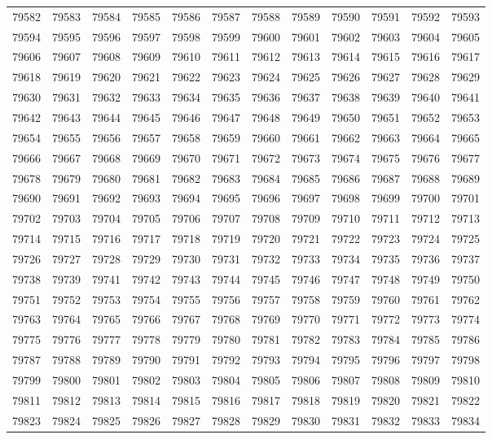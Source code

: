 \begin{center}
\begin{longtable}{llllllllllll}
79582 &79583 &79584 &79585 &79586 &79587 &79588 &79589 &79590 &79591 &79592 &79593 \\
79594 &79595 &79596 &79597 &79598 &79599 &79600 &79601 &79602 &79603 &79604 &79605 \\
79606 &79607 &79608 &79609 &79610 &79611 &79612 &79613 &79614 &79615 &79616 &79617 \\
79618 &79619 &79620 &79621 &79622 &79623 &79624 &79625 &79626 &79627 &79628 &79629 \\
79630 &79631 &79632 &79633 &79634 &79635 &79636 &79637 &79638 &79639 &79640 &79641 \\
79642 &79643 &79644 &79645 &79646 &79647 &79648 &79649 &79650 &79651 &79652 &79653 \\
79654 &79655 &79656 &79657 &79658 &79659 &79660 &79661 &79662 &79663 &79664 &79665 \\
79666 &79667 &79668 &79669 &79670 &79671 &79672 &79673 &79674 &79675 &79676 &79677 \\
79678 &79679 &79680 &79681 &79682 &79683 &79684 &79685 &79686 &79687 &79688 &79689 \\
79690 &79691 &79692 &79693 &79694 &79695 &79696 &79697 &79698 &79699 &79700 &79701 \\
79702 &79703 &79704 &79705 &79706 &79707 &79708 &79709 &79710 &79711 &79712 &79713 \\
79714 &79715 &79716 &79717 &79718 &79719 &79720 &79721 &79722 &79723 &79724 &79725 \\
79726 &79727 &79728 &79729 &79730 &79731 &79732 &79733 &79734 &79735 &79736 &79737 \\
79738 &79739 &79741 &79742 &79743 &79744 &79745 &79746 &79747 &79748 &79749 &79750 \\
79751 &79752 &79753 &79754 &79755 &79756 &79757 &79758 &79759 &79760 &79761 &79762 \\
79763 &79764 &79765 &79766 &79767 &79768 &79769 &79770 &79771 &79772 &79773 &79774 \\
79775 &79776 &79777 &79778 &79779 &79780 &79781 &79782 &79783 &79784 &79785 &79786 \\
79787 &79788 &79789 &79790 &79791 &79792 &79793 &79794 &79795 &79796 &79797 &79798 \\
79799 &79800 &79801 &79802 &79803 &79804 &79805 &79806 &79807 &79808 &79809 &79810 \\
79811 &79812 &79813 &79814 &79815 &79816 &79817 &79818 &79819 &79820 &79821 &79822 \\
79823 &79824 &79825 &79826 &79827 &79828 &79829 &79830 &79831 &79832 &79833 &79834 \\

\end{longtable}
\end{center}
